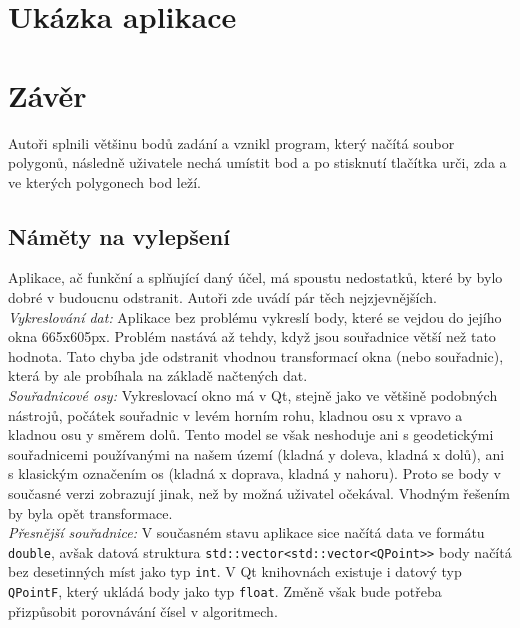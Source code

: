 \documentclass{article}
\begin{document}
\section{Ukázka aplikace} %
\clearpage
\section{Závěr}
\indent Autoři splnili většinu bodů zadání a vznikl program, který načítá soubor polygonů, následně uživatele nechá umístit bod a po stisknutí tlačítka urči, zda a ve kterých polygonech bod leží. 
	\subsection{Náměty na vylepšení} %
	\indent Aplikace, ač funkční a splňující daný účel, má spoustu nedostatků, které by bylo dobré v budoucnu odstranit. Autoři zde uvádí pár těch nejzjevnějších. \\
	\indent \textit{Vykreslování dat:} Aplikace bez problému vykreslí body, které se vejdou do jejího okna 665x605px. Problém nastává až tehdy, když jsou souřadnice větší než tato hodnota. Tato chyba jde odstranit vhodnou transformací okna (nebo souřadnic), která by ale probíhala na základě načtených dat. \\
	\indent \textit{Souřadnicové osy: } Vykreslovací okno má v Qt, stejně jako ve většině podobných nástrojů, počátek souřadnic v levém horním rohu, kladnou osu x vpravo a kladnou osu y směrem dolů. Tento model se však neshoduje ani s geodetickými souřadnicemi používanými na našem území (kladná y doleva, kladná x dolů), ani s klasickým označením os (kladná x doprava, kladná y nahoru). Proto se body v současné verzi zobrazují jinak, než by možná uživatel očekával. Vhodným řešením by byla opět transformace. \\
	\indent \textit{Přesnější souřadnice:} V současném stavu aplikace sice načítá data ve formátu \texttt{double}, avšak datová struktura \texttt{std::vector<std::vector<QPoint>>} body načítá bez desetinných míst jako typ \texttt{int}. V Qt knihovnách existuje i datový typ \texttt{QPointF}, který ukládá body jako typ \texttt{float}. Změně však bude potřeba přizpůsobit porovnávání čísel v algoritmech.


\pagestyle{empty}

\clearpage

\end{document}
